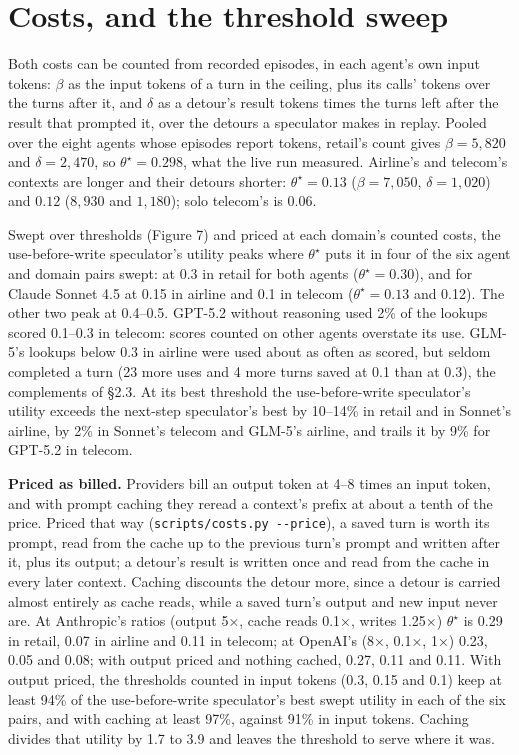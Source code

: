 \documentclass[10pt,twocolumn,letterpaper]{article}
\newcommand{\runin}[1]{{\sffamily\bfseries\color{accent}#1}}
\begin{document}
\hypertarget{costs-and-the-threshold-sweep}{%
\section{Costs, and the threshold sweep}\label{costs-and-the-threshold-sweep}}

Both costs can be counted from recorded episodes, in each agent's own input tokens: \(\beta\) as the input tokens of a turn in the ceiling, plus its calls' tokens over the turns after it, and \(\delta\) as a detour's result tokens times the turns left after the result that prompted it, over the detours a speculator makes in replay. Pooled over the eight agents whose episodes report tokens, retail's count gives \(\beta = 5{,}820\) and \(\delta = 2{,}470\), so \(\theta^\star = 0.298\), what the live run measured. Airline's and telecom's contexts are longer and their detours shorter: \(\theta^\star = 0.13\) (\(\beta = 7{,}050\), \(\delta = 1{,}020\)) and \(0.12\) (\(8{,}930\) and \(1{,}180\)); solo telecom's is \(0.06\).

Swept over thresholds (Figure 7) and priced at each domain's counted costs, the use-before-write speculator's utility peaks where \(\theta^\star\) puts it in four of the six agent and domain pairs swept: at 0.3 in retail for both agents (\(\theta^\star = 0.30\)), and for Claude Sonnet 4.5 at 0.15 in airline and 0.1 in telecom (\(\theta^\star = 0.13\) and 0.12). The other two peak at 0.4--0.5. GPT-5.2 without reasoning used 2\% of the lookups scored 0.1--0.3 in telecom: scores counted on other agents overstate its use. GLM-5's lookups below 0.3 in airline were used about as often as scored, but seldom completed a turn (23 more uses and 4 more turns saved at 0.1 than at 0.3), the complements of §2.3. At its best threshold the use-before-write speculator's utility exceeds the next-step speculator's best by 10--14\% in retail and in Sonnet's airline, by 2\% in Sonnet's telecom and GLM-5's airline, and trails it by 9\% for GPT-5.2 in telecom.

\runin{Priced as billed.} Providers bill an output token at 4--8 times an input token, and with prompt caching they reread a context's prefix at about a tenth of the price. Priced that way (\texttt{scripts/costs.py\ -\/-price}), a saved turn is worth its prompt, read from the cache up to the previous turn's prompt and written after it, plus its output; a detour's result is written once and read from the cache in every later context. Caching discounts the detour more, since a detour is carried almost entirely as cache reads, while a saved turn's output and new input never are. At Anthropic's ratios (output 5×, cache reads 0.1×, writes 1.25×) \(\theta^\star\) is 0.29 in retail, 0.07 in airline and 0.11 in telecom; at OpenAI's (8×, 0.1×, 1×) 0.23, 0.05 and 0.08; with output priced and nothing cached, 0.27, 0.11 and 0.11. With output priced, the thresholds counted in input tokens (0.3, 0.15 and 0.1) keep at least 94\% of the use-before-write speculator's best swept utility in each of the six pairs, and with caching at least 97\%, against 91\% in input tokens. Caching divides that utility by 1.7 to 3.9 and leaves the threshold to serve where it was.
\end{document}
